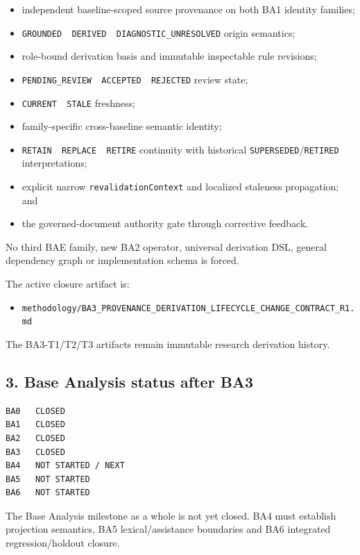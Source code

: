 \documentclass[11pt,a4paper]{article}
\providecommand{\tightlist}{\setlength{\itemsep}{0pt}\setlength{\parskip}{0pt}}
\begin{document}
\begin{itemize}
\tightlist
\item
  independent baseline-scoped source provenance on both BA1 identity families;
\item
  \texttt{GROUNDED\ \textbar{}\ DERIVED\ \textbar{}\ DIAGNOSTIC\_UNRESOLVED} origin semantics;
\item
  role-bound derivation basis and immutable inspectable rule revisions;
\item
  \texttt{PENDING\_REVIEW\ \textbar{}\ ACCEPTED\ \textbar{}\ REJECTED} review state;
\item
  \texttt{CURRENT\ \textbar{}\ STALE} freshness;
\item
  family-specific cross-baseline semantic identity;
\item
  \texttt{RETAIN\ \textbar{}\ REPLACE\ \textbar{}\ RETIRE} continuity with historical \texttt{SUPERSEDED}/\texttt{RETIRED} interpretations;
\item
  explicit narrow \texttt{revalidationContext} and localized staleness propagation; and
\item
  the governed-document authority gate through corrective feedback.
\end{itemize}

No third BAE family, new BA2 operator, universal derivation DSL, general dependency graph or implementation schema is forced.

The active closure artifact is:

\begin{itemize}
\tightlist
\item
  \texttt{methodology/BA3\_PROVENANCE\_DERIVATION\_LIFECYCLE\_CHANGE\_CONTRACT\_R1.md}
\end{itemize}

The BA3-T1/T2/T3 artifacts remain immutable research derivation history.

\subsection{3. Base Analysis status after BA3}\label{base-analysis-status-after-ba3}

\begin{verbatim}
BA0   CLOSED
BA1   CLOSED
BA2   CLOSED
BA3   CLOSED
BA4   NOT STARTED / NEXT
BA5   NOT STARTED
BA6   NOT STARTED
\end{verbatim}

The Base Analysis milestone as a whole is not yet closed. BA4 must establish projection semantics, BA5 lexical/assistance boundaries and BA6 integrated regression/holdout closure.
\end{document}

